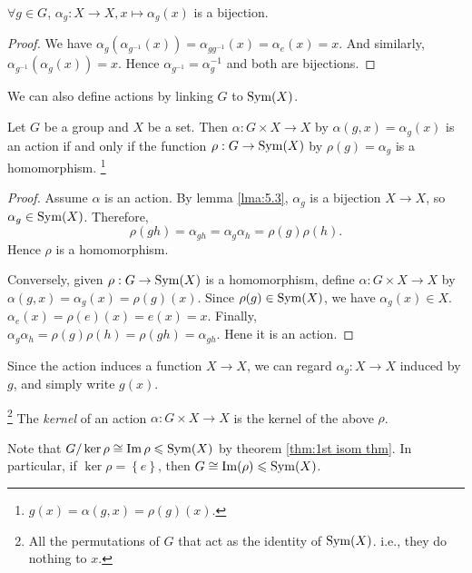 \documentclass[a4paper]{article}
\begin{document}
\begin{lemma}\label{lma:5.3}
  $ \forall g\in G $, $ \alpha_g:X\to X, x \mapsto \alpha_g(x) $ is a bijection.
\end{lemma}
\begin{proof}
  We have $
  \alpha_g(\alpha_{g^{-1}}(x))=\alpha_{gg^{-1}}(x)=\alpha_e(x)=x $.
  And similarly, $ \alpha_{g^{-1}}(\alpha_g(x))=x $. Hence $
  \alpha_{g^{-1}}=\alpha_g^{-1} $ and both are bijections.
\end{proof}
We can also define actions by linking $G$ to $ \operatorname{Sym}(X) $.
\begin{proposition}\label{prop:5.4}
  Let $G$ be a group and $X$ be a set. Then $ \alpha:G \times X \to X
  $ by $ \alpha(g,x)=\alpha_g(x) $ is an action if and only if the
  function $ \rho:G \to \operatorname{Sym}(X) $ by $ \rho(g)=\alpha_g $ is a homomorphism.
  \footnote{$ g(x)=\alpha(g,x)=\rho(g)(x) $.}
\end{proposition}

\begin{proof}
  Assume $ \alpha $ is an action. By lemma \ref{lma:5.3}, $ \alpha_g
  $ is a bijection $ X \to X $, so $ \alpha_g\in \operatorname{Sym}(X) $. Therefore,
  \[
    \rho(gh)=\alpha_{gh}=\alpha_g \alpha_h=\rho(g)\rho(h)
  .\]
  Hence $ \rho $ is a homomorphism.

  Conversely, given $ \rho:G \to \operatorname{Sym}(X) $ is a homomorphism, define
  $ \alpha:G \times X \to X $ by $ \alpha(g,x)=\alpha_g(x)=\rho(g)(x)
  $. Since $ \rho(g)\in \operatorname{Sym}(X) $, we have $ \alpha_g(x)\in X $. $
  \alpha_e(x)=\rho(e)(x)=e(x)=x $. Finally, $ \alpha_g
  \alpha_h=\rho(g)\rho(h)=\rho(gh)=\alpha_{gh}$. Hene it is an action.
\end{proof}
\begin{remark}
  Since the action induces a function $ X \to X $, we can regard $
  \alpha_g:X \to X $ induced by $g$, and simply write $ g(x) $.
\end{remark}
\begin{definition}
  \footnote{All the permutations of $G$ that act as the identity of $
  \operatorname{Sym}(X) $. i.e., they do nothing to $x$.}
  The \textit{kernel} of an action $ \alpha:G \times X \to X $ is the
  kernel of the above $ \rho $.
\end{definition}
Note that $ G/\ker \rho \cong \operatorname{Im} \rho\leqslant \operatorname{Sym}(X) $ by theorem
\ref{thm:1st isom thm}. In particular, if $ \ker \rho = \left\{
e\right\} $, then $ G \cong \operatorname{Im}(\rho)\leqslant \operatorname{Sym}(X) $.
\end{document}
